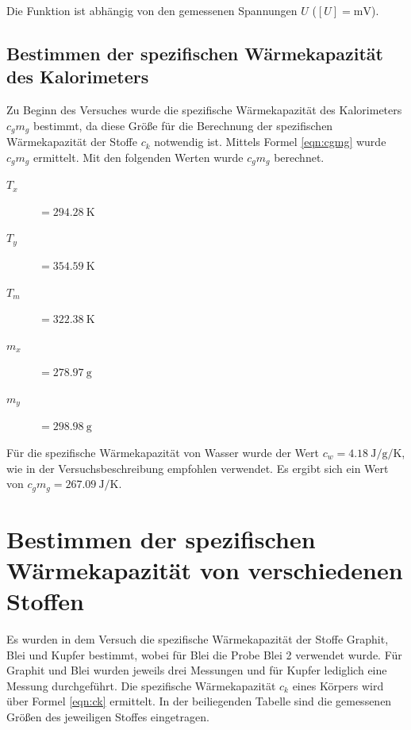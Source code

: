 Die Funktion ist abhängig von den gemessenen Spannungen $U$ ($[U] = \si{\milli\volt}$).

\subsection{Bestimmen der spezifischen Wärmekapazität des Kalorimeters}

Zu Beginn des Versuches wurde die spezifische Wärmekapazität des Kalorimeters
$c_gm_g$ bestimmt, da diese Größe für die Berechnung der spezifischen
Wärmekapazität der Stoffe $c_k$ notwendig ist. Mittels Formel \eqref{eqn:cgmg} wurde
$c_gm_g$ ermittelt. Mit den folgenden Werten wurde $c_gm_g$ berechnet.

\begin{description}
  \item[$T_x$]$ = \SI{294,28}{\kelvin}$
  \item[$T_y$]$ = \SI{354,59}{\kelvin}$
  \item[$T_m$]$ = \SI{322,38}{\kelvin}$
  \item[$m_x$]$ = \SI{278,97}{\gram}$
  \item[$m_y$]$ = \SI{298,98}{\gram}$
\end{description}

Für die spezifische Wärmekapazität von Wasser wurde der Wert $c_w =
\SI{4,18}{\joule\per\gram\per\kelvin}$, wie in der Versuchsbeschreibung
\cite{anleitung} empfohlen verwendet.
Es ergibt sich ein Wert von $c_gm_g = \SI{267,09}{\joule\per\kelvin}$.

\section{Bestimmen der spezifischen Wärmekapazität von verschiedenen Stoffen}

Es wurden in dem Versuch die spezifische Wärmekapazität der Stoffe Graphit,
Blei und Kupfer bestimmt, wobei für Blei die Probe Blei 2 verwendet wurde.
Für Graphit und Blei wurden jeweils drei Messungen und für Kupfer lediglich eine
Messung durchgeführt. Die spezifische Wärmekapazität $c_k$ eines Körpers
wird über Formel \eqref{eqn:ck} ermittelt. In der beiliegenden Tabelle sind die gemessenen
Größen des jeweiligen Stoffes eingetragen.

